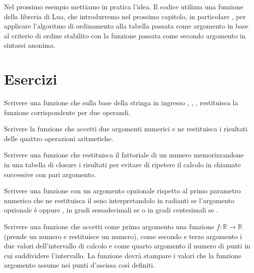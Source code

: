 Nel prossimo esempio mettiamo in pratica l'idea. Il codice utilizza una
funzione della libreria di Lua, che introdurremo nel prossimo capitolo, in
particolare , per applicare l'algoritmo di ordinamento alla
tabella passata come argomento in base al criterio di ordine stabilito con la
funzione passata come secondo argomento in sintassi anonima.


\section{Esercizi}

\begin{Exercise}[label=fn-01]
Scrivere una funzione che sulla base della stringa in ingresso ,
, ,  restituisca la funzione corrispondente per due
operandi.
\end{Exercise}

\begin{Exercise}[label=fn-02]
Scrivere la funzione che accetti due argomenti numerici e ne restituisca i
risultati delle quattro operazioni aritmetiche.
\end{Exercise}

\begin{Exercise}[label=fn-03]
Scrivere una funzione che restituisca il fattoriale di un numero memorizzandone
in una tabella di closure i risultati per evitare di ripetere il calcolo in
chiamate successive con pari argomento.
\end{Exercise}

\begin{Exercise}[label=fn-04]
Scrivere una funzione con un argomento opzionale rispetto al primo parametro
numerico che ne restituisca il seno interpretandolo in radianti se l'argomento
opzionale è  oppure , in gradi sessadecimali se  o
in gradi centesimali se .
\end{Exercise}

\begin{Exercise}[label=fn-05]
Scrivere una funzione che accetti come primo argomento una funzione \( f:
ℝ \to ℝ \) (prende un numero e restituisce un numero), come
secondo e terzo argomento i due valori dell'intervallo di calcolo e come quarto
argomento il numero di punti in cui suddividere l'intervallo. La funzione dovrà
stampare i valori che la funzione argomento assume nei punti d'ascissa così
definiti.
\end{Exercise}


